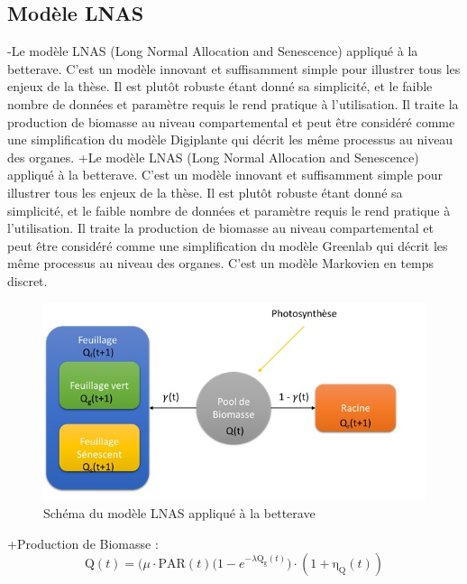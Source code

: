  \subsection{Modèle LNAS}
 
-Le modèle LNAS (Long Normal Allocation and Senescence) appliqué à la betterave. C’est un modèle innovant et suffisamment simple pour illustrer tous les enjeux de la thèse. Il est plutôt robuste étant donné sa simplicité, et le faible nombre de données et paramètre requis le rend pratique à l’utilisation. Il traite la production de biomasse au niveau compartemental et peut être considéré comme une simplification du modèle Digiplante qui décrit les même processus au niveau des organes.
+Le modèle LNAS (Long Normal Allocation and Senescence) appliqué à la betterave. C’est un modèle innovant et suffisamment simple pour illustrer tous les enjeux de la thèse. Il est plutôt robuste étant donné sa simplicité, et le faible nombre de données et paramètre requis le rend pratique à l’utilisation. Il traite la production de biomasse au niveau compartemental et peut être considéré comme une simplification du modèle Greenlab qui décrit les même processus au niveau des organes.
 C’est un modèle Markovien en temps discret.
 
 \begin{figure}[h]
 	\begin{center}
 	
 	
   \includegraphics[scale=1.0]{./img/sBeetRoot.jpg}
   \caption{Schéma du modèle LNAS appliqué à la betterave}
   \label{fig:sBeetRoot}
   
   \end{center}
 \end{figure}
 
+Production de Biomasse :
 \[ \mathrm{Q}(t) = \big(\mu\cdot\mathrm{PAR}(t)(1-e^{-\lambda\mathrm{Q_g}(t)}\big)\cdot(1+\mathrm{\eta_Q}(t)) \]
 
